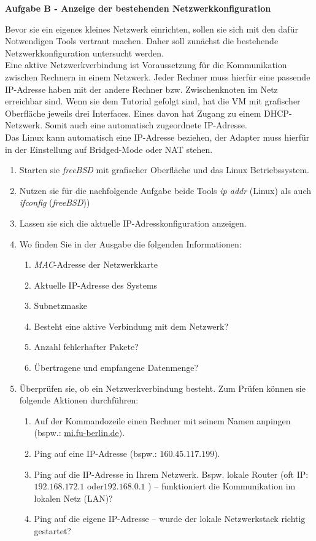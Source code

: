 \documentclass[paper=a4,fontsize=11pt]{scrartcl}%
\begin{document}
\begin{center}
\Large{\textbf{Aufgabe B - Anzeige der bestehenden Netzwerkkonfiguration}}
\end{center}
Bevor sie ein eigenes kleines Netzwerk einrichten, sollen sie sich mit den dafür Notwendigen Tools vertraut machen. Daher soll zunächst die bestehende Netzwerkkonfiguration untersucht werden.\\
Eine aktive Netzwerkverbindung ist Voraussetzung für die Kommunikation zwischen Rechnern in einem Netzwerk. Jeder Rechner muss hierfür eine passende IP-Adresse haben mit der andere Rechner bzw. Zwischenknoten im Netz erreichbar sind. Wenn sie dem Tutorial gefolgt sind, hat die VM mit grafischer Oberfläche jeweils drei Interfaces. Eines davon hat Zugang zu einem DHCP-Netzwerk. Somit auch eine automatisch zugeordnete IP-Adresse.\\
Das Linux kann automatisch eine IP-Adresse beziehen, der Adapter muss hierfür in der Einstellung auf Bridged-Mode oder NAT stehen.
\begin{enumerate}
	\item Starten sie \emph{freeBSD} mit grafischer Oberfläche und das Linux Betriebssystem.
	\item Nutzen sie für die nachfolgende Aufgabe beide Tools \emph{ip addr} (Linux) als auch \emph{ifconfig} (\emph{freeBSD}))
	\item Lassen sie sich die aktuelle IP-Adresskonfiguration anzeigen.
	\item Wo finden Sie in der Ausgabe die folgenden Informationen:
	\begin{enumerate}
		\item \emph{MAC}-Adresse der Netzwerkkarte
		\item Aktuelle IP-Adresse des Systems
		\item Subnetzmaske
		\item Besteht eine aktive Verbindung mit dem Netzwerk?
		\item Anzahl fehlerhafter Pakete?
		\item Übertragene und empfangene Datenmenge?
	\end{enumerate}
	\item Überprüfen sie, ob ein Netzwerkverbindung besteht. Zum Prüfen können sie folgende Aktionen durchführen:
	\begin{enumerate}
		\item Auf der Kommandozeile einen Rechner mit seinem Namen anpingen (bspw.: \url{mi.fu-berlin.de}).
		\item Ping auf eine IP-Adresse (bspw.: $160.45.117.199$).
		\item Ping auf die IP-Adresse in Ihrem Netzwerk. Bspw. lokale Router (oft IP: $192.168.172.1$ oder$192.168.0.1$ ) -- funktioniert die Kommunikation im lokalen Netz (LAN)?
		\item Ping auf die eigene IP-Adresse -- wurde der lokale Netzwerkstack richtig gestartet?
	\end{enumerate}
\end{enumerate}
\end{document}
